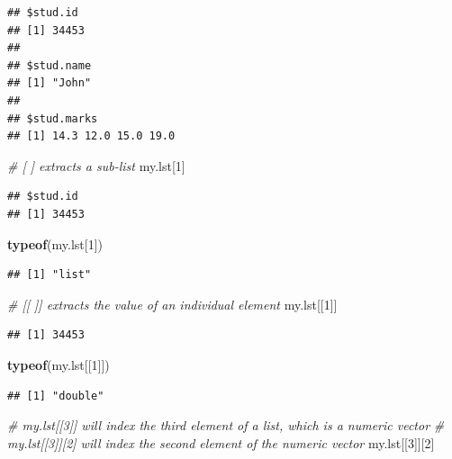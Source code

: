 \documentclass[]{book}
\newenvironment{Shaded}{\begin{snugshade}}{\end{snugshade}}
\newcommand{\CommentTok}[1]{\textcolor[rgb]{0.56,0.35,0.01}{\textit{#1}}}
\newcommand{\DecValTok}[1]{\textcolor[rgb]{0.00,0.00,0.81}{#1}}
\newcommand{\KeywordTok}[1]{\textcolor[rgb]{0.13,0.29,0.53}{\textbf{#1}}}
\newcommand{\NormalTok}[1]{#1}
\begin{document}
\begin{verbatim}
## $stud.id
## [1] 34453
## 
## $stud.name
## [1] "John"
## 
## $stud.marks
## [1] 14.3 12.0 15.0 19.0
\end{verbatim}

\begin{Shaded}
\begin{Highlighting}[]
\CommentTok{# [ ] extracts a sub-list }
\NormalTok{my.lst[}\DecValTok{1}\NormalTok{]}
\end{Highlighting}
\end{Shaded}

\begin{verbatim}
## $stud.id
## [1] 34453
\end{verbatim}

\begin{Shaded}
\begin{Highlighting}[]
\KeywordTok{typeof}\NormalTok{(my.lst[}\DecValTok{1}\NormalTok{])}
\end{Highlighting}
\end{Shaded}

\begin{verbatim}
## [1] "list"
\end{verbatim}

\begin{Shaded}
\begin{Highlighting}[]
\CommentTok{# [[ ]] extracts the value of an individual element }
\NormalTok{my.lst[[}\DecValTok{1}\NormalTok{]]}
\end{Highlighting}
\end{Shaded}

\begin{verbatim}
## [1] 34453
\end{verbatim}

\begin{Shaded}
\begin{Highlighting}[]
\KeywordTok{typeof}\NormalTok{(my.lst[[}\DecValTok{1}\NormalTok{]])}
\end{Highlighting}
\end{Shaded}

\begin{verbatim}
## [1] "double"
\end{verbatim}

\begin{Shaded}
\begin{Highlighting}[]
\CommentTok{# my.lst[[3]] will index the third element of a list, which is a numeric vector}
\CommentTok{# my.lst[[3]][2] will index the second element of the numeric vector}
\NormalTok{my.lst[[}\DecValTok{3}\NormalTok{]][}\DecValTok{2}\NormalTok{]}
\end{Highlighting}
\end{Shaded}
\end{document}
